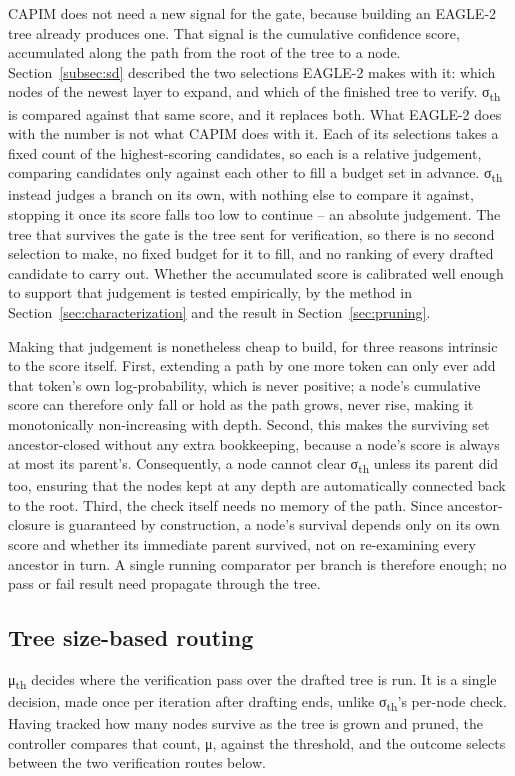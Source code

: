 \documentclass[11pt]{article}
\begin{document}
CAPIM does not need a new signal for the gate, because building an EAGLE-2 tree already produces one. That signal is the cumulative confidence score, accumulated along the path from the root of the tree to a node. Section~\ref{subsec:sd} described the two selections EAGLE-2 makes with it: which nodes of the newest layer to expand, and which of the finished tree to verify. σ\textsubscript{th} is compared against that same score, and it replaces both. What EAGLE-2 does with the number is not what CAPIM does with it. Each of its selections takes a fixed count of the highest-scoring candidates, so each is a relative judgement, comparing candidates only against each other to fill a budget set in advance. σ\textsubscript{th} instead judges a branch on its own, with nothing else to compare it against, stopping it once its score falls too low to continue -- an absolute judgement. The tree that survives the gate is the tree sent for verification, so there is no second selection to make, no fixed budget for it to fill, and no ranking of every drafted candidate to carry out. Whether the accumulated score is calibrated well enough to support that judgement is tested empirically, by the method in Section~\ref{sec:characterization} and the result in Section~\ref{sec:pruning}.

Making that judgement is nonetheless cheap to build, for three reasons intrinsic to the score itself. First, extending a path by one more token can only ever add that token's own log-probability, which is never positive; a node's cumulative score can therefore only fall or hold as the path grows, never rise, making it monotonically non-increasing with depth. Second, this makes the surviving set ancestor-closed without any extra bookkeeping, because a node's score is always at most its parent's. Consequently, a node cannot clear σ\textsubscript{th} unless its parent did too, ensuring that the nodes kept at any depth are automatically connected back to the root. Third, the check itself needs no memory of the path. Since ancestor-closure is guaranteed by construction, a node's survival depends only on its own score and whether its immediate parent survived, not on re-examining every ancestor in turn. A single running comparator per branch is therefore enough; no pass or fail result need propagate through the tree.

\subsection{Tree size-based routing}
\label{sec:routing}
μ\textsubscript{th} decides where the verification pass over the drafted tree is run. It is a single decision, made once per iteration after drafting ends, unlike σ\textsubscript{th}'s per-node check. Having tracked how many nodes survive as the tree is grown and pruned, the controller compares that count, μ, against the threshold, and the outcome selects between the two verification routes below.
\end{document}
